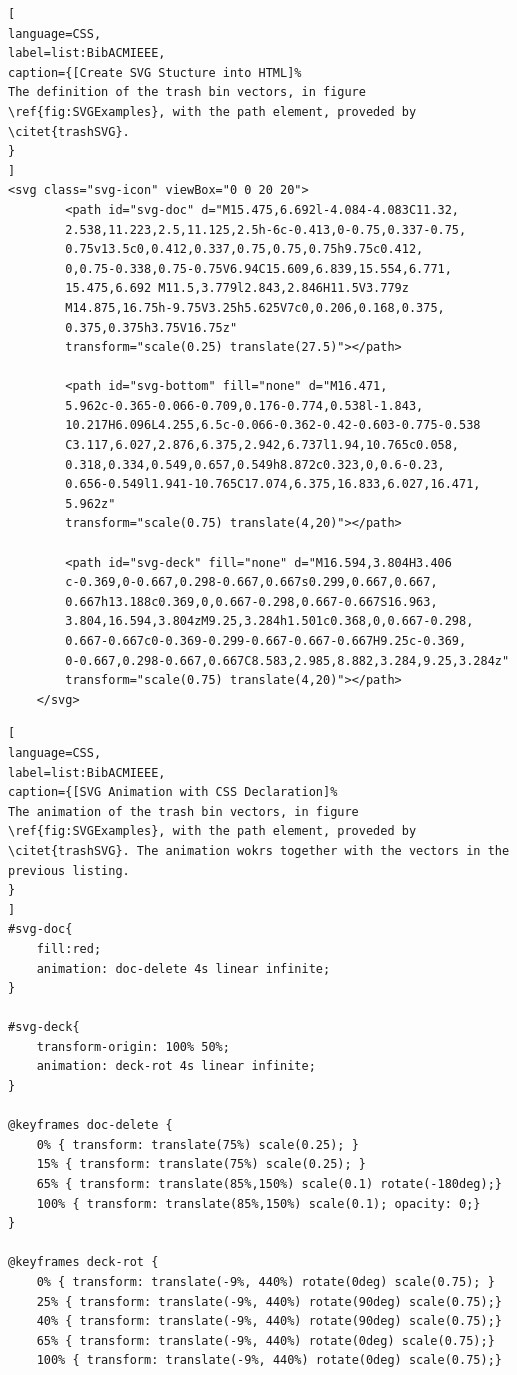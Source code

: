 \begin{lstlisting}[
language=CSS,
label=list:BibACMIEEE,
caption={[Create SVG Stucture into HTML]%
The definition of the trash bin vectors, in figure \ref{fig:SVGExamples}, with the path element, proveded by \citet{trashSVG}.
}
]
<svg class="svg-icon" viewBox="0 0 20 20">
		<path id="svg-doc" d="M15.475,6.692l-4.084-4.083C11.32,
		2.538,11.223,2.5,11.125,2.5h-6c-0.413,0-0.75,0.337-0.75,
		0.75v13.5c0,0.412,0.337,0.75,0.75,0.75h9.75c0.412,
		0,0.75-0.338,0.75-0.75V6.94C15.609,6.839,15.554,6.771,
		15.475,6.692 M11.5,3.779l2.843,2.846H11.5V3.779z
		M14.875,16.75h-9.75V3.25h5.625V7c0,0.206,0.168,0.375,
		0.375,0.375h3.75V16.75z"
		transform="scale(0.25) translate(27.5)"></path>

		<path id="svg-bottom" fill="none" d="M16.471,
		5.962c-0.365-0.066-0.709,0.176-0.774,0.538l-1.843,
		10.217H6.096L4.255,6.5c-0.066-0.362-0.42-0.603-0.775-0.538
		C3.117,6.027,2.876,6.375,2.942,6.737l1.94,10.765c0.058,
		0.318,0.334,0.549,0.657,0.549h8.872c0.323,0,0.6-0.23,
		0.656-0.549l1.941-10.765C17.074,6.375,16.833,6.027,16.471,
		5.962z"
		transform="scale(0.75) translate(4,20)"></path>

		<path id="svg-deck" fill="none" d="M16.594,3.804H3.406
		c-0.369,0-0.667,0.298-0.667,0.667s0.299,0.667,0.667,
		0.667h13.188c0.369,0,0.667-0.298,0.667-0.667S16.963,
		3.804,16.594,3.804zM9.25,3.284h1.501c0.368,0,0.667-0.298,
		0.667-0.667c0-0.369-0.299-0.667-0.667-0.667H9.25c-0.369,
		0-0.667,0.298-0.667,0.667C8.583,2.985,8.882,3.284,9.25,3.284z"
		transform="scale(0.75) translate(4,20)"></path>
	</svg>

\end{lstlisting}
\label{list:SVGStuctureHTML}

\begin{lstlisting}[
language=CSS,
label=list:BibACMIEEE,
caption={[SVG Animation with CSS Declaration]%
The animation of the trash bin vectors, in figure \ref{fig:SVGExamples}, with the path element, proveded by \citet{trashSVG}. The animation wokrs together with the vectors in the previous listing.
}
]
#svg-doc{
	fill:red;
	animation: doc-delete 4s linear infinite;
}

#svg-deck{
	transform-origin: 100% 50%;
	animation: deck-rot 4s linear infinite;
}

@keyframes doc-delete {
	0% { transform: translate(75%) scale(0.25); }
	15% { transform: translate(75%) scale(0.25); }
	65% { transform: translate(85%,150%) scale(0.1) rotate(-180deg);}
	100% { transform: translate(85%,150%) scale(0.1); opacity: 0;}
}

@keyframes deck-rot {
	0% { transform: translate(-9%, 440%) rotate(0deg) scale(0.75); }
	25% { transform: translate(-9%, 440%) rotate(90deg) scale(0.75);}
	40% { transform: translate(-9%, 440%) rotate(90deg) scale(0.75);}
	65% { transform: translate(-9%, 440%) rotate(0deg) scale(0.75);}
	100% { transform: translate(-9%, 440%) rotate(0deg) scale(0.75);}

\end{lstlisting}
\label{list:Keys_CSS}